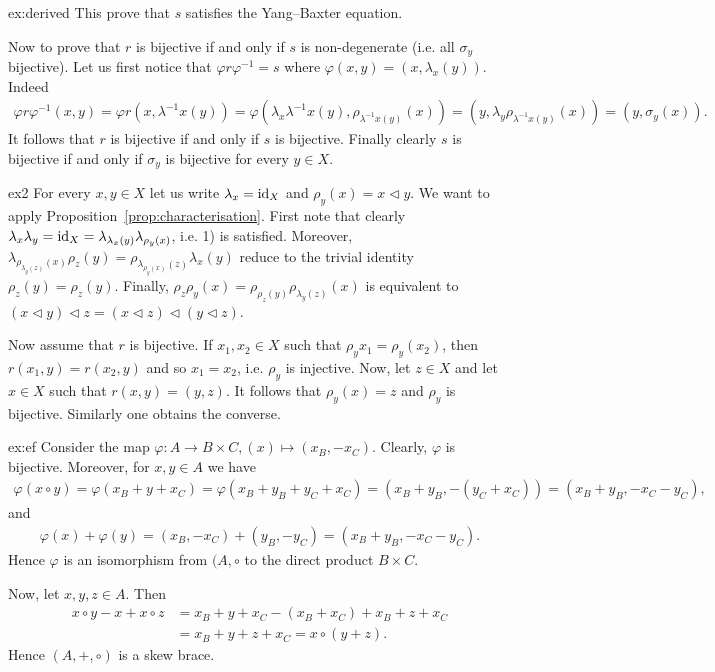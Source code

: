 \begin{sol}{ex:derived}
    This prove that $s$ satisfies the Yang--Baxter equation.

    Now to prove that $r$ is bijective if and only if $s$ is non-degenerate (i.e. all $\sigma_y$ bijective). Let us first notice that $\varphi r\varphi^{-1} = s$ where $\varphi(x,y)=(x,\lambda_x(y))$. Indeed
    \begin{align*}
        \varphi r \varphi^{-1}(x,y) = \varphi r (x, \lambda^{-1}x(y))
        =\varphi(\lambda_x\lambda^{-1}x(y), \rho_{\lambda^{-1}x(y)}(x))
        =(y, \lambda_y\rho_{\lambda^{-1}x(y)}(x)) = (y,\sigma_y(x)).
    \end{align*}
    It follows that $r$ is bijective if and only if $s$ is bijective. Finally clearly $s$ is bijective if and only if $\sigma_y$ is bijective for every $y\in X$. 
\end{sol}

\begin{sol}{ex2}
    For every $x,y \in X$ let us write $\lambda_x = \operatorname{id}_X$ and $\rho_y(x)=x \triangleleft y$.
    We want to apply Proposition~\ref{prop:characterisation}.
    First note that clearly $\lambda_x\lambda_y =\operatorname{id}_X = \lambda_{\lambda_x(y)}\lambda_{\rho_y(x)}$, i.e. 1) is satisfied. 
    Moreover,$\lambda_{\rho_{\lambda_y(z)}(x)}\rho_z(y)=\rho_{\lambda_{\rho_y(x)}(z)}\lambda_x(y)$ reduce to the trivial identity $\rho_z(y)=\rho_{z}(y)$.
    Finally,  $\rho_z\rho_y(x)=\rho_{\rho_z(y)}\rho_{\lambda_y(z)}(x)$ is equivalent to $(x\triangleleft y)\triangleleft z=(x\triangleleft z)\triangleleft(y\triangleleft z)$.

    Now assume that $r$ is bijective. If $x_1,x_2\in X$ such that $\rho_y{x_1}=\rho_y(x_2)$, then $r(x_1,y)=r(x_2,y)$ and so $x_1=x_2$, i.e. $\rho_y$ is injective. Now, let $z \in X$ and let $x\in X$ such that $r(x,y) =(y,z)$. It follows that $\rho_y(x)=z$ and $\rho_y$ is bijective. 
    Similarly one obtains the converse. 
\end{sol}



\begin{sol}{ex:ef}
    Consider the map $\varphi:A\to B\times C, (x) \mapsto (x_B,-x_C)$. Clearly, $\varphi$ is bijective. Moreover, for $x,y\in A$ we have
    \begin{align*}
        \varphi(x\circ y) = \varphi(x_B+y+x_C) = \varphi(x_B+y_B+y_C+x_C) 
        =(x_B+y_B,-(y_C+x_C)) = (x_B+y_B,-x_C-y_C),
    \end{align*}
    and 
    \begin{align*}
        \varphi(x)+\varphi(y) = (x_B,-x_C) + (y_B,-y_C) = (x_B+y_B,-x_C-y_C).
    \end{align*}
    Hence $\varphi$ is an isomorphism from $(A,\circ$ to the direct product $B\times C$.
    
    Now, let $x,y,z \in A$. Then 
    \begin{align*}
        x\circ y - x + x\circ z &= x_B + y + x_C - (x_B+x_C) +x_B + z + x_C\\
        &=x_B + y + z + x_C = x \circ (y+z).
    \end{align*}
    Hence $(A,+,\circ)$ is a skew brace.
\end{sol}

